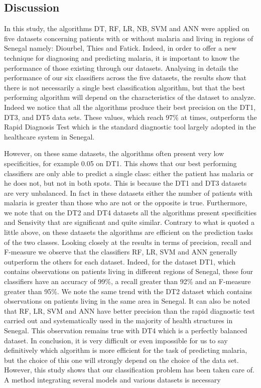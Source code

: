 \subsection{Discussion}
In this study, the algorithms DT, RF, LR, NB, SVM and ANN were applied on five datasets concerning patients with or without malaria and living in regions of Senegal namely: Diourbel, Thies and Fatick. Indeed, in order to offer a new technique for diagnosing and predicting malaria, it is important to know the performance of those existing through our datasets.
Analysing in details the performance of our six classifiers across the five datasets, the results show that there is not necessarily a single best classification algorithm, but that the best performing algorithm will depend on the characteristics of the dataset to analyze. Indeed we notice that all the algorithms produce their best precision on the DT1, DT3, and DT5 data sets. These values, which reach 97\% at times, outperform the Rapid Diagnosis Test which is the standard diagnostic tool largely adopted in the healthcare system in Senegal.

However, on these same datasets, the algorithms often present very low specificities, for example 0.05 on DT1. This shows that our best performing classifiers are only able to predict a single class: either the patient has malaria or he does not, but not in both spots. This is because the DT1 and DT3 datasets are very unbalanced. In fact in these datasets either the number of patients with malaria is greater than those who are not or the opposite is true. Furthermore, we note that on the DT2 and DT4 datasets all the algorithms present specificities and Sensivity that are significant and quite similar. Contrary to what is quoted a little above, on these datasets the algorithms are efficient on the prediction tasks of the two classes. Looking closely at the results in terms of precision, recall and F-measure we observe that the classifiers RF, LR, SVM and ANN generally outperform the others for each dataset. Indeed, for the dataset DT1, which contains observations on patients living in different regions of Senegal, these four classifiers have an accuracy of 99\%, a recall greater than 92\% and an F-measure greater than 95\%. We note the same trend with the DT2 dataset which contains observations on patients living in the same area in Senegal. It can also be noted that RF, LR, SVM and ANN have better precision than the rapid diagnostic test carried out and systematically used in the majority of health structures in Senegal. This observation remains true with DT4 which is a perfectly balanced dataset. In conclusion, it is very difficult or even impossible for us to say definitively which algorithm is more efficient for the task of predicting malaria, but the choice of this one will strongly depend on the choice of the data set. However, this study shows that our classification problem has been taken care of. A method integrating several models and various datasets is necessary

